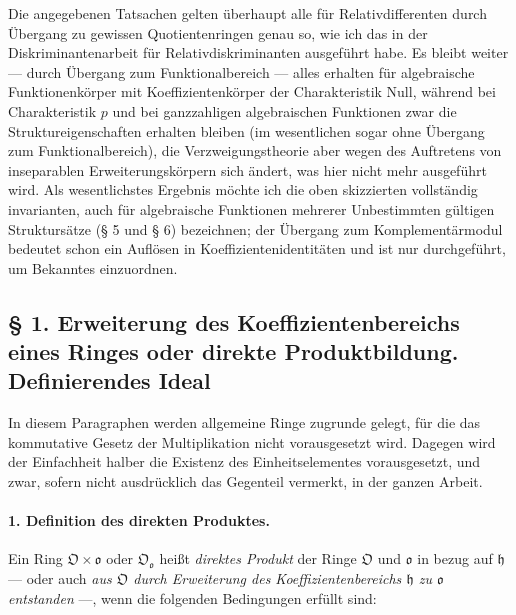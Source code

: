 Die angegebenen Tatsachen gelten überhaupt alle für Relativdifferenten durch Übergang zu gewissen Quotientenringen genau so, wie ich das in der Diskriminantenarbeit für Relativdiskriminanten ausgeführt habe. Es bleibt weiter --- durch Übergang zum Funktionalbereich --- alles erhalten für algebraische Funktionenkörper mit Koeffizientenkörper der Charakteristik Null, während bei Charakteristik $p$ und bei ganzzahligen algebraischen Funktionen zwar die Struktureigenschaften erhalten bleiben (im wesentlichen sogar ohne Übergang zum Funktionalbereich), die Verzweigungstheorie aber wegen des Auftretens von inseparablen Erweiterungskörpern sich ändert, was hier nicht mehr ausgeführt wird. Als wesentlichstes Ergebnis möchte ich die oben skizzierten vollständig invarianten, auch für algebraische Funktionen mehrerer Unbestimmten gültigen Struktursätze (§ 5 und § 6) bezeichnen; der Übergang zum Komplementärmodul bedeutet schon ein Auflösen in Koeffizientenidentitäten und ist nur durchgeführt, um Bekanntes einzuordnen.
\subsection*{§ 1. Erweiterung des Koeffizientenbereichs eines Ringes oder direkte Produktbildung. Definierendes Ideal}

In diesem Paragraphen werden allgemeine Ringe zugrunde gelegt, für die das kommutative Gesetz der Multiplikation nicht vorausgesetzt wird. Dagegen wird der Einfachheit halber die Existenz des Einheitselementes vorausgesetzt, und zwar, sofern nicht ausdrücklich das Gegenteil vermerkt, in der ganzen Arbeit.

\paragraph{1. Definition des direkten Produktes.}
Ein Ring $\mathfrak O\times\mathfrak o$ oder $\mathfrak O_{\mathfrak o}$ heißt \emph{direktes Produkt} der Ringe $\mathfrak O$ und $\mathfrak o$ in bezug auf $\mathfrak h$ --- oder auch \emph{aus $\mathfrak O$ durch Erweiterung des Koeffizientenbereichs $\mathfrak h$ zu $\mathfrak o$ entstanden} ---, wenn die folgenden Bedingungen erfüllt sind:

